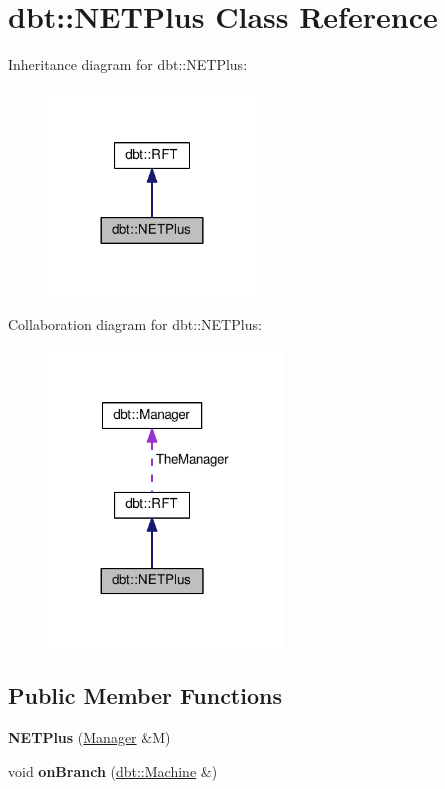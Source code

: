 \hypertarget{classdbt_1_1_n_e_t_plus}{}\section{dbt\+:\+:N\+E\+T\+Plus Class Reference}
\label{classdbt_1_1_n_e_t_plus}


Inheritance diagram for dbt\+:\+:N\+E\+T\+Plus\+:\nopagebreak
\begin{figure}[H]
\begin{center}
\leavevmode
\includegraphics[width=156pt]{classdbt_1_1_n_e_t_plus__inherit__graph}
\end{center}
\end{figure}


Collaboration diagram for dbt\+:\+:N\+E\+T\+Plus\+:\nopagebreak
\begin{figure}[H]
\begin{center}
\leavevmode
\includegraphics[width=176pt]{classdbt_1_1_n_e_t_plus__coll__graph}
\end{center}
\end{figure}
\subsection*{Public Member Functions}
\begin{DoxyCompactItemize}
\item 
{\bfseries N\+E\+T\+Plus} (\hyperlink{classdbt_1_1_manager}{Manager} \&M)\hypertarget{classdbt_1_1_n_e_t_plus_a65756d1c78e9fa337752b8cba109411f}{}\label{classdbt_1_1_n_e_t_plus_a65756d1c78e9fa337752b8cba109411f}

\item 
void {\bfseries on\+Branch} (\hyperlink{classdbt_1_1_machine}{dbt\+::\+Machine} \&)\hypertarget{classdbt_1_1_n_e_t_plus_aeaccc9c3a82d5aab75d1dd9afd458448}{}\label{classdbt_1_1_n_e_t_plus_aeaccc9c3a82d5aab75d1dd9afd458448}

\end{DoxyCompactItemize}
